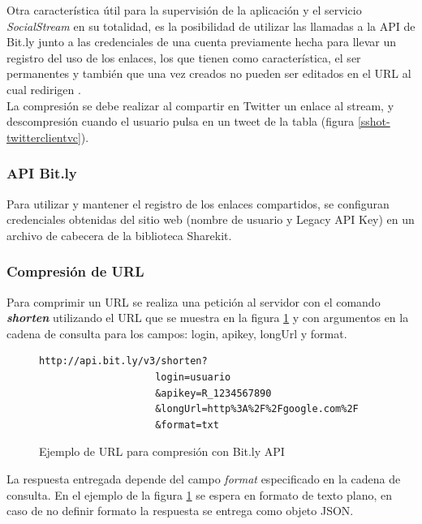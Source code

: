 Otra característica útil para la supervisión de la aplicación y el servicio \textit{SocialStream} en su totalidad, es la posibilidad de utilizar las llamadas a la API de Bit.ly junto a las credenciales de una cuenta previamente hecha para llevar un registro del uso de los enlaces, los que tienen como característica, el ser permanentes y también que una vez creados no pueden ser editados en el URL al cual redirigen \cite{bib:bitly-permanent}.\\



La compresión se debe realizar al compartir en Twitter un enlace al stream, y descompresión cuando el usuario pulsa en un tweet de la tabla (figura \ref{sshot-twitterclientvc}).

		\subsubsection{API Bit.ly}

Para utilizar y mantener el registro de los enlaces compartidos, se configuran credenciales obtenidas del sitio web \cite{bitly-settings} (nombre de usuario y Legacy API Key) en un archivo de cabecera de la biblioteca Sharekit.


		
		\subsubsection{Compresión de URL}
Para comprimir un URL se realiza una petición al servidor con el comando \textit{\textbf{shorten}} utilizando el URL que se muestra en la figura \ref{bitly-shorten} y con argumentos en la cadena de consulta para los campos: login, apikey, longUrl y format.

\begin{figure}[H]
	\centering
\begin{lstlisting}
http://api.bit.ly/v3/shorten?
					login=usuario
					&apikey=R_1234567890
					&longUrl=http%3A%2F%2Fgoogle.com%2F
					&format=txt
\end{lstlisting}
	\caption{Ejemplo de URL para compresión con Bit.ly API}
	\label{bitly-shorten}
\end{figure}	

La respuesta entregada depende del campo \textit{format} especificado en la cadena de consulta. En el ejemplo de la figura \ref{bitly-shorten} se espera en formato de texto plano, en caso de no definir formato la respuesta se entrega como objeto JSON.\\


